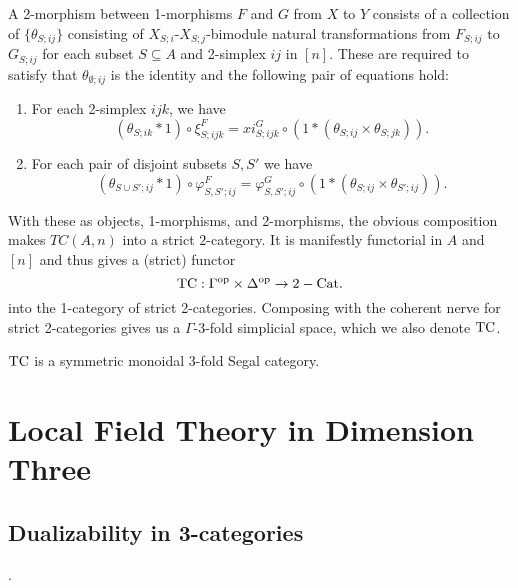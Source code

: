 \documentclass{amsart}
\begin{document}
A 2-morphism between 1-morphisms $F$ and $G$ from $X$ to $Y$ consists of a collection of $\{ \theta_{S;ij} \}$ consisting of $X_{S;i}$-$X_{S;j}$-bimodule natural transformations from $F_{S;ij}$ to $G_{S;ij}$ for each subset $S \subseteq A$ and 2-simplex $ij$ in $[n]$. These are required to satisfy that $\theta_{\emptyset;ij}$ is the identity and the following pair of equations hold:
\begin{enumerate}
	\item For each 2-simplex $ijk$, we have
	\begin{equation*}
		(\theta_{S; ik} * 1) \circ \xi^F_{S; ijk} = xi^G_{S;ijk} \circ (1 * (\theta_{S; ij} \times \theta_{S; jk})).
	\end{equation*}
	\item For each pair of disjoint subsets $S, S'$ we have
	\begin{equation*}
		(\theta_{S \cup S'; ij} * 1) \circ \varphi^F_{S, S'; ij} = \varphi^G_{S,S';ij} \circ (1*(\theta_{S;ij} \times \theta_{S';ij})).
	\end{equation*}
\end{enumerate}
With these as objects, 1-morphisms, and 2-morphisms, the obvious composition makes $TC(A,n)$ into a strict $2$-category. It is manifestly functorial in $A$ and $[n]$ and thus gives a (strict) functor 
\begin{equation*}
	\mathrm{TC}: \Gamma^\textrm{op} \times \Delta^\textrm{op} \to 2-\mathrm{Cat}.
\end{equation*}
into the 1-category of strict 2-categories. Composing with the coherent nerve for strict 2-categories gives us a $\Gamma$-3-fold simplicial space, which we also denote $\mathrm{TC}$.

\begin{theorem}
	 $\mathrm{TC}$ is a symmetric monoidal 3-fold Segal category.  
\end{theorem}





\section{Local Field Theory in Dimension Three} \label{sec-lft}

\subsection{Dualizability in 3-categories} \label{sec-lft-dual}
.
\end{document}
